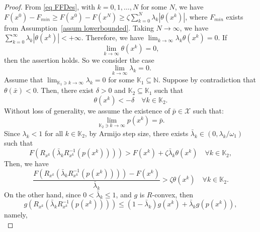 \documentclass[pdflatex,sn-mathphys-num]{sn-jnl}%
\theoremstyle{definition} %
\theoremstyle{remark} %
\begin{document}
\begin{proof}
        From \eqref{eq FFDes}, with $k =0,1,\ldots, N$ for some $N$, we have $F(x^0)-F_{min} \geq F(x^0)-F(x^N) \geq \zeta  \sum_{k=0}^{N} \lambda_k\left|\theta (x^k)\right|$, where $F_{min}$ exists from Assumption~\ref{assum lowerbounded}. Taking $N\rightarrow \infty$, we have $\sum_{k=0}^{\infty} \lambda_k\left|\theta (x^k)\right| < +\infty$. 
        Therefore, we have $\lim _{k \rightarrow\infty}\lambda_k\theta (x^k)=0$.
        If
        \begin{equation}\label{theta 0}
            \lim _{k \rightarrow \infty}\theta (x^k)=0,
        \end{equation}
        then the assertion holds.
        So we consider the case 
        \begin{equation}\label{lambda 0}
            \lim _{k \rightarrow \infty}\lambda_k =0.
        \end{equation}
        Assume that $\lim _{ \mathbb{K}_1 \ni k \to \infty} \lambda_k=0$ for some $\mathbb{K}_1 \subseteq \mathbb{N}$. 
        Suppose by contradiction that $\theta(\bar{x})<0$. Then, there exist $\delta>0$ and $\mathbb{K}_2 \subseteq \mathbb{K}_1$ such that
        $$
        \theta (x^k)<-\delta \quad \forall k \in \mathbb{K}_2 .
        $$
        Without loss of generality, we assume the existence of \(\bar{p} \in \mathcal{X}\) such that:
        $$
        \lim _{\mathbb{K}_2 \ni k \to \infty} p (x^k)=\bar{p}.
        $$
        Since $\lambda_k<1$ for all $k \in \mathbb{K}_2$, by Armijo step size, there exists $\bar{\lambda}_k \in (0, \lambda_k / \omega_1)$ such that
        $$
        F (R_{x^k}  (\bar{\lambda}_k R_{x^k}^{-1}(p (x^k))))>F (x^k)+\zeta \bar{\lambda}_k \theta (x^k) \quad \forall k \in \mathbb{K}_2,
        $$
        Then, we have
        \begin{equation}\label{armijoK2}
            \frac{F (R_{x^k}  (\bar{\lambda}_k R_{x^k}^{-1}( p (x^k))))-F (x^k)}{\bar{\lambda}_k}>\zeta \theta (x^k) \quad \forall k \in \mathbb{K}_2 .
        \end{equation}
        On the other hand, since $0<\bar{\lambda}_k \leq 1$, and $g$ is $R$-convex, then
        $$
        g (R_{x^k}  (\bar{\lambda}_k R_{x^k}^{-1}(p (x^k))) )\leq  (1-\bar{\lambda}_k)g (x^k) + \bar{\lambda}_k g (p (x^k)),
        $$ 
        namely,
        \begin{equation}\label{eq: gconvex}

\end{equation}
\end{proof}
\end{document}
